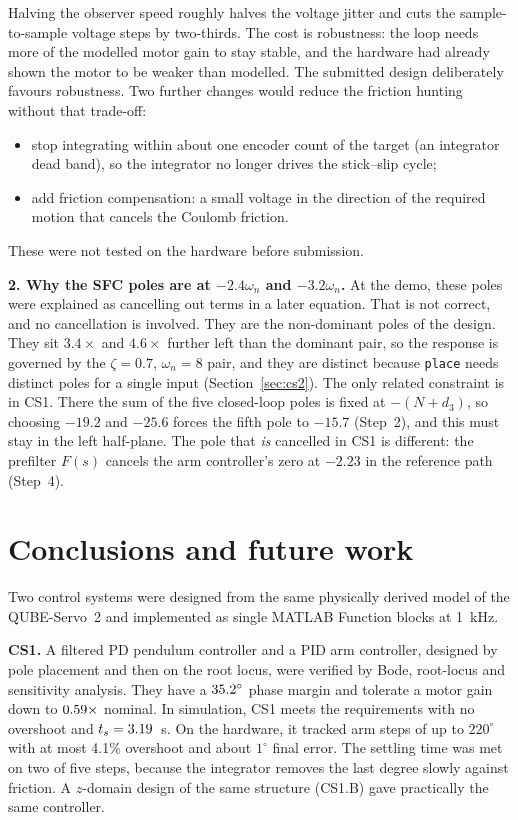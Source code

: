\documentclass[11pt,a4paper]{article}
\begin{document}
Halving the observer speed roughly halves the voltage jitter and cuts the
sample-to-sample voltage steps by two-thirds. The cost is robustness: the
loop needs more of the modelled motor gain to stay stable, and the hardware
had already shown the motor to be weaker than modelled. The submitted
design deliberately favours robustness. Two further changes would reduce
the friction hunting without that trade-off:
\begin{itemize}[nosep]
\item stop integrating within about one encoder count of the target (an
  integrator dead band), so the integrator no longer drives the stick--slip
  cycle;
\item add friction compensation: a small voltage in the direction of the
  required motion that cancels the Coulomb friction.
\end{itemize}
These were not tested on the hardware before submission.

\textbf{2. Why the SFC poles are at $-2.4\omega_n$ and $-3.2\omega_n$.}
At the demo, these poles were explained as cancelling out terms in a later
equation. That is not correct, and no cancellation is involved. They are
the non-dominant poles of the design. They sit $3.4\times$ and $4.6\times$
further left than the dominant pair, so the response is governed by the
$\zeta=0.7$, $\omega_n=8$ pair, and they are distinct because
\texttt{place} needs distinct poles for a single input (Section~\ref{sec:cs2}).
The only related constraint is in CS1. There the sum of the five
closed-loop poles is fixed at $-(N+d_3)$, so choosing $-19.2$ and $-25.6$
forces the fifth pole to $-15.7$ (Step~2), and this must stay in the
left half-plane. The pole that \emph{is} cancelled in CS1 is different: the
prefilter $F(s)$ cancels the arm controller's zero at $-2.23$ in the
reference path (Step~4).

\section{Conclusions and future work}\label{sec:conclusion}
Two control systems were designed from the same physically derived
model of the QUBE-Servo~2 and implemented as single MATLAB Function
blocks at 1~kHz.

\textbf{CS1.} A filtered PD pendulum controller and a PID arm controller,
designed by pole placement and then on the root locus, were verified by
Bode, root-locus and sensitivity analysis. They have a $35.2^\circ$
phase margin and tolerate a motor gain down to $0.59\times$ nominal.
In simulation, CS1 meets the requirements with no overshoot and
$t_s=3.19$~s. On the hardware, it tracked arm steps of up to
$220^\circ$ with at most 4.1\% overshoot and about $1^\circ$ final error.
The settling time was met on two of five steps, because the integrator
removes the last degree slowly against friction. A $z$-domain design of
the same structure (CS1.B) gave practically the same controller.
\end{document}
